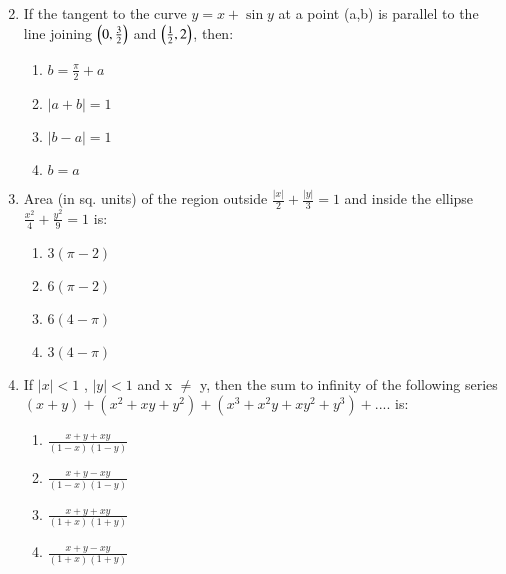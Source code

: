 \documentclass[journal]{IEEEtran}
\numberwithin{equation}{enumi}
\numberwithin{figure}{enumi}
\begin{document}
\begin{enumerate}
\begin{multicols}{2}
\begin{enumerate}
    \end{enumerate} 
    \end{multicols}
    \item If the tangent to the curve $y=x+\sin{y}$ at a point (a,b) is parallel to the line joining $\left(0,\frac{3}{2}\right)$ and $\left(\frac{1}{2},{2}\right)$, then: \\
    \begin{multicols}{4}
    \begin{enumerate}
        \item $b = \frac{\pi}{2} + a$
        \item $|a + b| = 1$
        \item $|b - a| = 1$
        \item $b = a$
    \end{enumerate} 
    \end{multicols}
    \item Area (in sq. units) of the region outside $\frac{|x|}{2} + \frac{|y|}{3} = 1$ and inside the ellipse $\frac{x^2}{4} + \frac{y^2}{9} = 1$ is: \\
    \begin{multicols}{4}
    \begin{enumerate}
        \item $3(\pi - 2)$
        \item $6(\pi - 2)$
        \item $6(4 - \pi)$
        \item $3(4 - \pi)$
    \end{enumerate} 
    \end{multicols}
    \item If $|x|<1$ , $|y|<1$ and x $\neq$ y, then the sum to infinity of the following series $(x+y)+(x^2+xy+y^2)+(x^3+x^2y+xy^2+y^3)+....$ is: \\
    \begin{multicols}{4}
    \begin{enumerate}
        \item $\frac{x + y + xy}{(1 - x)(1 - y)}$
        \item $\frac{x + y - xy}{(1 - x)(1 - y)}$
        \item $\frac{x + y + xy}{(1 + x)(1 + y)}$
        \item $\frac{x + y - xy}{(1 + x)(1 + y)}$
    \end{enumerate} 
    \end{multicols}

\end{enumerate}
\end{document}
